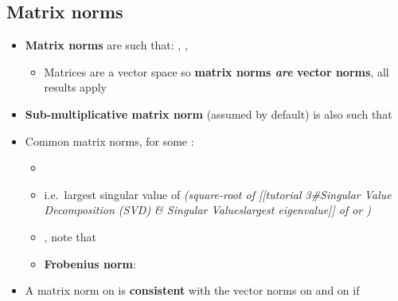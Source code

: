 \subsection*{Matrix norms}

\begin{itemize}

  \item
        \textbf{Matrix norms} are such that:
        ,
        ,

        \begin{itemize}

          \item
                Matrices  are a vector space so
                \textbf{matrix norms \emph{are} vector norms}, all results apply
        \end{itemize}
  \item
        \textbf{Sub-multiplicative matrix norm} (assumed by default) is also
        such that
  \item
        Common matrix norms, for some
        :

        \begin{itemize}

          \item
          \item
                i.e.~largest singular value of  \emph{(square-root of
                {[}{[}tutorial 3\#Singular Value Decomposition (SVD) \& Singular
                Values\textbar largest eigenvalue{]}{]} of  or
                )}
          \item
                ,
                note that
          \item
                \textbf{Frobenius norm}:
        \end{itemize}
  \item
        A matrix norm \iMbox{\|\cdot\|} on  is
        \textbf{consistent} with the vector norms  on
         and  on 
        if


\end{itemize}
